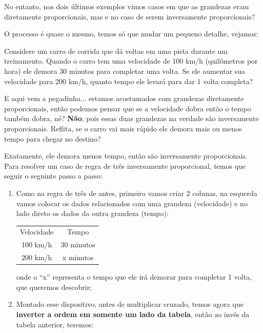 No entanto, nos dois últimos exemplos vimos casos em que as grandezas eram diretamente proporcionais, mas e no caso de serem inversamente proporcionais?

O processo é quase o mesmo, temos só que mudar um pequeno detalhe, vejamos:

\begin{exemplo}
    Considere um carro de corrida que dá voltas em uma pista durante um treinamento. Quando o carro tem uma velocidade de 100 km/h (quilômetros por hora) ele demora 30 minutos para completar uma volta. Se ele aumentar sua velocidade para 200 km/h, quanto tempo ele levará para dar 1 volta completa?

    \vspace{0.5cm}

    E aqui vem a pegadinha... estamos acostumados com grandezas diretamente proporcionais, então podemos pensar que se a velocidade dobra então o tempo também dobra, né? \textbf{Não}, pois essas duas grandezas na verdade são inversamente proporcionais. Reflita, se o carro vai mais rápido ele demora mais ou menos tempo para chegar no destino?

    \vspace{0.5cm}

    Exatamente, ele demora menos tempo, então são inversamente proporcionais. Para resolver um caso de regra de três inversamente proporcional, temos que seguir o seguinte passo a passo:
    
    \begin{enumerate}
        \item Como na regra de três de antes, primeiro vamos criar 2 colunas, na esquerda vamos colocar os dados relacionados com uma grandeza (velocidade) e no lado direto os dados da outra grandeza (tempo):
        \begin{table}[H]
            \centering
            \begin{tabular}{cc}
                Velocidade & Tempo \\
                100 km/h & 30 minutos\\
                200 km/h & x minutos
            \end{tabular}

        \end{table}
        onde o ``x'' representa o tempo que ele irá demorar para completar 1 volta, que queremos descobrir;
        \item Montado esse dispositivo, antes de multiplicar cruzado, temos agora que \textbf{inverter a ordem em somente um lado da tabela}, então ao invés da tabela anterior, teremos:


\end{enumerate}
\end{exemplo}
